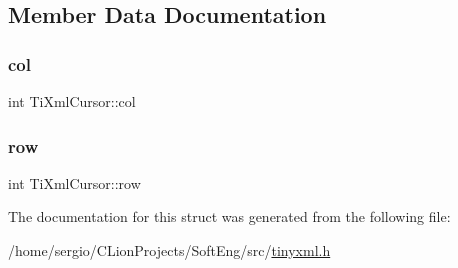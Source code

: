 \subsection{Member Data Documentation}
\mbox{\label{struct_ti_xml_cursor_a5694d7ed2c4d20109d350c14c417969d}} 
\subsubsection{\texorpdfstring{col}{col}}
{\footnotesize\ttfamily int Ti\+Xml\+Cursor\+::col}

\mbox{\label{struct_ti_xml_cursor_a5b54dd949820c2db061e2be41f3effb3}} 
\subsubsection{\texorpdfstring{row}{row}}
{\footnotesize\ttfamily int Ti\+Xml\+Cursor\+::row}



The documentation for this struct was generated from the following file\+:\begin{DoxyCompactItemize}
\item 
/home/sergio/\+C\+Lion\+Projects/\+Soft\+Eng/src/\hyperlink{tinyxml_8h}{tinyxml.\+h}\end{DoxyCompactItemize}
